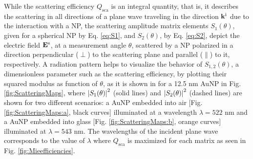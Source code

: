 While the scattering efficiency $Q_\text{sca}$ is an integral quantity, that is, it describes the scattering in all directions of a plane wave traveling in the  direction $\vb{k}^\text{i}$ due to the interaction with a NP, the scattering amplitude matrix elements $S_1(\theta)$,  given  for a spherical NP by Eq. \eqref{eq:S1}, and  $S_2(\theta)$, by Eq. \eqref{eq:S2}, depict the  electric field $\vb{E}^\text{s}$, at a measurement angle $\theta$,  scattered by a NP polarized in a direction perpendicular ($\perp$) to the scattering plane and parallel ($\parallel$) to it, respectively. A radiation pattern helps to visualize the behavior of $S_{1,2}(\theta)$, a dimensionless parameter such as the scattering efficiency, by plotting their squared modulus as function of $\theta$, as it is shown in for a 12.5 nm AuNP in Fig. \ref{fig:ScatteringMaps}, where $\abs{S_{1}(\theta)}^2$ (solid lines) and $\abs{S_2(\theta)}^2$ (dashed lines) are shown for two different scenarios: a AuNP embedded into air [Fig. \ref{fig:ScatteringMaps:a}, black curves]  illuminated  at a wavelength $\lambda = 522$ nm and a AuNP embedded into glass  [Fig. \ref{fig:ScatteringMaps:b}, orange curves]  illuminated at $\lambda = 543$ nm. The wavelengths of the incident plane wave corresponds to the value of $\lambda$ where $Q_\text{sca}$ is maximized for each matrix as seen in Fig. \ref{fig:Mieefficiencies}.

